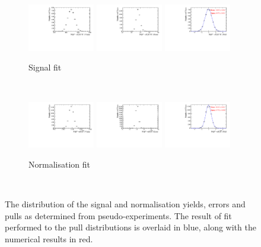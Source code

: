 \begin{figure}[!h]
   \centering
   \begin{subfigure}[t]{1.0\textwidth}
      \includegraphics[width=0.32\textwidth]{figs/B2DsKK/Plots_DsKK_nsig_val.pdf}
      \includegraphics[width=0.32\textwidth]{figs/B2DsKK/Plots_DsKK_nsig_err.pdf}
      \includegraphics[width=0.32\textwidth]{figs/B2DsKK/Plots_DsKK_nsig_pul.pdf}
      \caption{Signal fit}
   \end{subfigure}\\
   \begin{subfigure}[t]{1.0\textwidth}
      \includegraphics[width=0.32\textwidth]{figs/B2DsKK/Plots_DsD0_nsig_val.pdf}
      \includegraphics[width=0.32\textwidth]{figs/B2DsKK/Plots_DsD0_nsig_err.pdf}
      \includegraphics[width=0.32\textwidth]{figs/B2DsKK/Plots_DsD0_nsig_pul.pdf}
      \caption{Normalisation fit}
   \end{subfigure}\\
   \caption{The distribution of the signal and normalisation yields, errors and pulls as determined from pseudo-experiments. The result of fit performed to the pull distributions is overlaid in blue, along with the numerical results in red.}
   \label{fig:B2DsKK_Pulls}
\end{figure}
